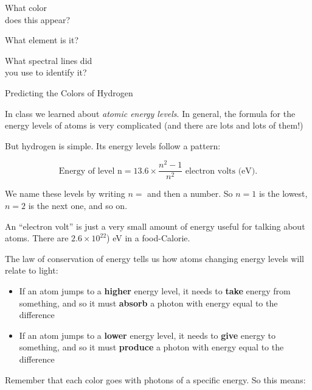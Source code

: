 \documentclass[11pt]{article}
\begin{document}
\begin{minipage}{0.33\textwidth}
	What color \\does this appear?
\end{minipage}
\begin{minipage}{0.33\textwidth}
	What element is it?
\end{minipage}
\begin{minipage}{0.33\textwidth}
	What spectral lines did\\
	you use to identify it?
\end{minipage}

\vspace{1.0in}

\newpage
\begin{landscape}
	
	\begin{center}
		\Large 
		Predicting the Colors of Hydrogen
	\end{center}
	
	\large 
	In class we learned about {\it atomic energy levels}. In general, the formula for the energy levels of atoms is very complicated (and there are lots and lots of them!)
	
	But hydrogen is simple. Its energy levels follow a pattern:
	
	$$\text{Energy of level n} = 13.6 \times \frac{n^2-1}{n^2} \text{ electron volts (eV)}.$$
	
	We name these levels by writing $n=$ and then a number. So $n=1$ is the lowest, $n=2$ is the next one, and so on.
	
	An ``electron volt'' is just a very small amount of energy useful for talking about atoms. There are $2.6 \times 10^{22}$) eV in a food-Calorie.
	
	The law of conservation of energy tells us how atoms changing energy levels will relate to light:
	
	
	\begin{itemize}
		\item If an atom jumps to a {\bf higher} energy level, it needs to {\bf take} energy from something, and so it must  {\bf absorb} a photon with energy equal to the difference
		\item If an atom jumps to a {\bf lower} energy level, it needs to {\bf give} energy to something, and so it must {\bf produce} a photon with energy equal to the difference
	\end{itemize}
	
	Remember that each color goes with photons of a specific energy. So this means:
	

\end{landscape}
\end{document}
